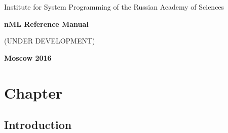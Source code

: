 \documentclass[oneside,final,14pt]{extreport}
\begin{document}
\begin{titlepage}
\begin{center}
\Large{Institute for System Programming of the Russian Academy of Sciences}

\vfill


\bf\Large{nML Reference Manual}

(UNDER DEVELOPMENT)

\vfill

\bf
Moscow 2016
\end{center}


\end{titlepage}

\newpage
{} %
\tableofcontents

\newpage


\chapter{Chapter}

\section{Introduction}



\end{document}
